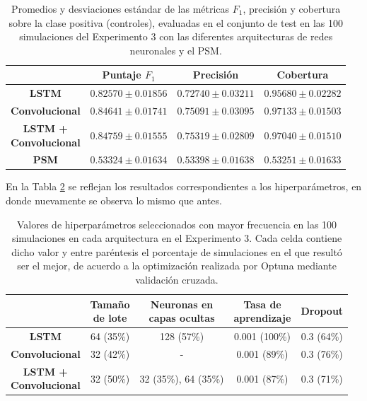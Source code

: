 \documentclass[../../main.tex]{subfiles}
\begin{document}
\begin{table}[ht]
    \centering
    \renewcommand{\arraystretch}{1.2}
    \begin{tabular}{|c|c|c|c|}
        \hline
         & \textbf{Puntaje} \(F_1\) & \textbf{Precisión} & \textbf{Cobertura} \\ \hline\hline
        \textbf{LSTM}
            & $0.82570 \pm 0.01856$ & $0.72740 \pm 0.03211$ & $0.95680 \pm 0.02282$ \\ \hline
        \textbf{Convolucional}
            & $0.84641 \pm 0.01741$ & $0.75091 \pm 0.03095$ & $\mathbf{0.97133 \pm 0.01503}$ \\ \hline
        \makecell{\textbf{LSTM +} \\ \textbf{Convolucional}}
            & $\mathbf{0.84759 \pm 0.01555}$ & $\mathbf{0.75319 \pm 0.02809}$ & $0.97040 \pm 0.01510$ \\ \hline
        \textbf{PSM}
            & $0.53324 \pm 0.01634$ & $0.53398 \pm 0.01638$ & $0.53251 \pm 0.01633$ \\
        \hline
    \end{tabular}
    \caption{Promedios y desviaciones estándar de las métricas \(F_1\), precisión y
    cobertura sobre la clase positiva (controles), evaluadas en el conjunto de test en las
    100 simulaciones del Experimento 3 con las diferentes arquitecturas de redes
    neuronales y el PSM.}
    \label{tab:results_exp3}
\end{table}

En la Tabla \ref{tab:hyperparams_exp3} se reflejan los resultados correspondientes
a los hiperparámetros, en donde nuevamente se observa lo mismo que antes.

\begin{table}[H]
    \centering
    \renewcommand{\arraystretch}{1.2}
    \begin{tabular}{|c|c|c|c|c|}
        \hline
            & \makecell{\textbf{Tamaño}\\\textbf{de lote}}
            & \makecell{\textbf{Neuronas en}\\\textbf{capas ocultas}}
            & \makecell{\textbf{Tasa de}\\\textbf{aprendizaje}}
            & \textbf{Dropout} \\ \hline\hline
        \textbf{LSTM}
            & 64 (35\%) & 128 (57\%) & 0.001 (100\%) & 0.3 (64\%) \\ \hline
        \textbf{Convolucional}
            & 32 (42\%) & -          & 0.001 (89\%)  & 0.3 (76\%) \\ \hline
        \makecell{\textbf{LSTM +}\\\textbf{Convolucional}}
            & 32 (50\%) & 32 (35\%), 64 (35\%) & 0.001 (87\%) & 0.3 (71\%) \\
        \hline
    \end{tabular}
    \caption{Valores de hiperparámetros seleccionados con mayor frecuencia en las 100
    simulaciones en cada arquitectura en el Experimento 3. Cada celda contiene dicho valor
    y entre paréntesis el porcentaje de simulaciones en el que resultó ser el mejor, de
    acuerdo a la optimización realizada por Optuna mediante validación cruzada.}
    \label{tab:hyperparams_exp3}
\end{table}
\end{document}
